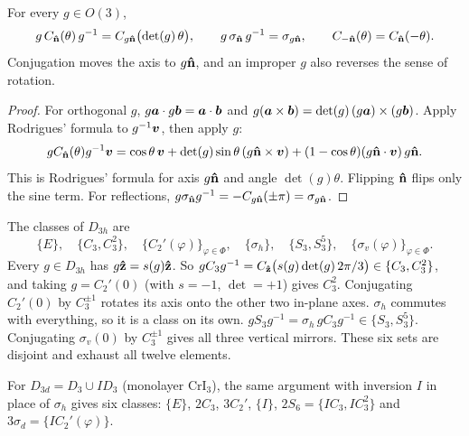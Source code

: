 \begin{theorem}
For every $g\in O(3)$,
\begin{equation}
    g\,C_{\boldsymbol{\hat{\textbf{n}}}}(\theta)\,g^{-1} = C_{g\boldsymbol{\hat{\textbf{n}}}}\bigl(\det(g)\,\theta\bigr),
    \qquad
    g\,\sigma_{\boldsymbol{\hat{\textbf{n}}}}\,g^{-1} = \sigma_{g\boldsymbol{\hat{\textbf{n}}}},
    \qquad
    C_{-\boldsymbol{\hat{\textbf{n}}}}(\theta) = C_{\boldsymbol{\hat{\textbf{n}}}}(-\theta).
\end{equation}
Conjugation moves the axis to $g\boldsymbol{\hat{\textbf{n}}}$, and an improper $g$ also reverses the sense of rotation.
\end{theorem}
\begin{proof}
For orthogonal $g$, $g\bm{a}\cdot g\bm{b} = \bm{a}\cdot\bm{b}$ and $g(\bm{a}\times\bm{b}) = \det(g)\,(g\bm{a})\times(g\bm{b})$. Apply Rodrigues' formula to $g^{-1}\bm{v}$, then apply $g$:
\[
    gC_{\boldsymbol{\hat{\textbf{n}}}}(\theta)g^{-1}\bm{v} = \cos\theta\,\bm{v} + \det(g)\sin\theta\,(g\boldsymbol{\hat{\textbf{n}}}\times\bm{v}) + (1-\cos\theta)(g\boldsymbol{\hat{\textbf{n}}}\cdot\bm{v})\,g\boldsymbol{\hat{\textbf{n}}}.
\]
This is Rodrigues' formula for axis $g\boldsymbol{\hat{\textbf{n}}}$ and angle $\det(g)\theta$. Flipping $\boldsymbol{\hat{\textbf{n}}}$ flips only the sine term. For reflections, $g\sigma_{\boldsymbol{\hat{\textbf{n}}}}g^{-1} = -C_{g\boldsymbol{\hat{\textbf{n}}}}(\pm\pi) = \sigma_{g\boldsymbol{\hat{\textbf{n}}}}$.
\end{proof}

\begin{example}
The classes of $D_{3h}$ are
\[
    \{E\},\quad \{C_3, C_3^2\},\quad \{C_2'(\varphi)\}_{\varphi\in\Phi},\quad \{\sigma_h\},\quad \{S_3, S_3^5\},\quad \{\sigma_v(\varphi)\}_{\varphi\in\Phi}.
\]
Every $g\in D_{3h}$ has $g\boldsymbol{\hat{\textbf{z}}} = s(g)\boldsymbol{\hat{\textbf{z}}}$. So $gC_3g^{-1} = C_{\boldsymbol{\hat{\textbf{z}}}}\bigl(s(g)\det(g)\,2\pi/3\bigr)\in\{C_3,C_3^2\}$, and taking $g = C_2'(0)$ (with $s = -1$, $\det = +1$) gives $C_3^2$. Conjugating $C_2'(0)$ by $C_3^{\pm1}$ rotates its axis onto the other two in-plane axes. $\sigma_h$ commutes with everything, so it is a class on its own. $gS_3g^{-1} = \sigma_h\,gC_3g^{-1}\in\{S_3, S_3^5\}$. Conjugating $\sigma_v(0)$ by $C_3^{\pm1}$ gives all three vertical mirrors. These six sets are disjoint and exhaust all twelve elements.

For $D_{3d} = D_3\cup ID_3$ (monolayer CrI$_3$), the same argument with inversion $I$ in place of $\sigma_h$ gives six classes: $\{E\}$, $2C_3$, $3C_2'$, $\{I\}$, $2S_6 = \{IC_3, IC_3^2\}$ and $3\sigma_d = \{IC_2'(\varphi)\}$.
\end{example}
